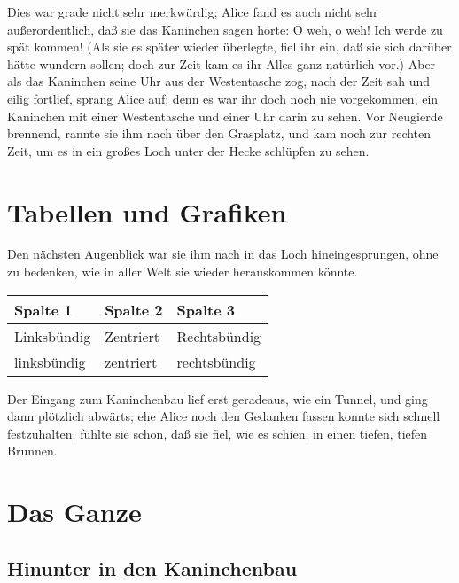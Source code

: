 \documentclass[DIV=calc,10pt,parskip=half,twocolumn]{scrartcl}
\begin{document}
Dies war grade nicht sehr merkwürdig; Alice fand es auch nicht sehr
außerordentlich, daß sie das Kaninchen sagen hörte: \grqq{} O weh, o weh! Ich werde zu
spät kommen!\grqq{}  (Als sie es später wieder überlegte, fiel ihr ein, daß sie sich
darüber hätte wundern sollen; doch zur Zeit kam es ihr Alles ganz natürlich
vor.) Aber als das Kaninchen seine Uhr aus der Westentasche zog, nach der Zeit
sah und eilig fortlief, sprang Alice auf; denn es war ihr doch noch nie
vorgekommen, ein Kaninchen mit einer Westentasche und einer Uhr darin zu sehen.
Vor Neugierde brennend, rannte sie ihm nach über den Grasplatz, und kam noch
zur rechten Zeit, um es in ein großes Loch unter der Hecke schlüpfen zu sehen.




\section{Tabellen und Grafiken}

Den nächsten Augenblick war sie ihm nach in das Loch hineingesprungen, ohne zu
bedenken, wie in aller Welt sie wieder herauskommen könnte.

\begin{center}
\begin{tabular}{lll}
  \toprule
   Spalte 1 &  Spalte 2 & Spalte 3\\
   \midrule
   Linksbündig & Zentriert & Rechtsbündig\\
   linksbündig & zentriert & rechtsbündig\\
   \bottomrule
\end{tabular}
\end{center}

Der Eingang zum Kaninchenbau lief erst geradeaus, wie ein Tunnel, und ging dann
plötzlich abwärts; ehe Alice noch den Gedanken fassen konnte sich schnell
festzuhalten, fühlte sie schon, daß sie fiel, wie es schien, in einen tiefen,
tiefen Brunnen.

\clearpage


\section{Das Ganze}



\subsection{Hinunter in den Kaninchenbau}
\end{document}
